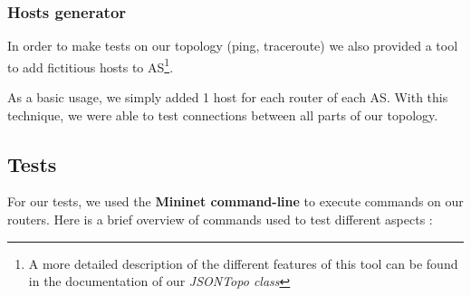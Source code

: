 \documentclass[letter, 9pt, conference]{ieeeconf}
\begin{document}
\subsubsection{Hosts generator}

In order to make tests on our topology (ping, traceroute) we also provided a tool to add fictitious hosts to AS\footnote{A more detailed description of the different features of this tool can be found in the documentation of our \textit{JSONTopo class}}.

As a basic usage, we simply added 1 host for each router of each AS. With this technique, we were able to test connections between all parts of our topology. 

\subsection{Tests}
\label{sec:tests}

For our tests, we used the \textbf{Mininet command-line} to execute commands on our routers. Here is a brief overview of commands used to test different aspects : 
\end{document}
